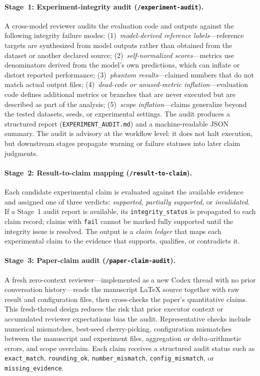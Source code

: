 \documentclass{article}
\theoremstyle{remark}
\begin{document}
\paragraph{Stage~1: Experiment-integrity audit (\texttt{/experiment-audit}).}
A cross-model reviewer audits the evaluation code and outputs against the following integrity failure modes:
(1)~\emph{model-derived reference labels}---reference targets are synthesized from model outputs rather than obtained from the dataset or another declared source;
(2)~\emph{self-normalized scores}---metrics use denominators derived from the model's own predictions, which can inflate or distort reported performance;
(3)~\emph{phantom results}---claimed numbers that do not match actual output files;
(4)~\emph{dead-code or unused-metric inflation}---evaluation code defines additional metrics or branches that are never executed but are described as part of the analysis;
(5)~\emph{scope inflation}---claims generalize beyond the tested datasets, seeds, or experimental settings.
The audit produces a structured report (\texttt{EXPERIMENT\_AUDIT.md}) and a machine-readable JSON summary.
The audit is advisory at the workflow level: it does not halt execution, but downstream stages propagate warning or failure statuses into later claim judgments.

\paragraph{Stage~2: Result-to-claim mapping (\texttt{/result-to-claim}).}
Each candidate experimental claim is evaluated against the available evidence and assigned one of three verdicts: \emph{supported}, \emph{partially supported}, or \emph{invalidated}.
If a Stage~1 audit report is available, its \texttt{integrity\_status} is propagated to each claim record; claims with \texttt{fail} cannot be marked fully supported until the integrity issue is resolved.
The output is a \emph{claim ledger} that maps each experimental claim to the evidence that supports, qualifies, or contradicts it.

\paragraph{Stage~3: Paper-claim audit (\texttt{/paper-claim-audit}).}
A fresh zero-context reviewer---implemented as a new Codex thread with no prior conversation history---reads the manuscript \LaTeX{} source together with raw result and configuration files, then cross-checks the paper's quantitative claims.
This fresh-thread design reduces the risk that prior executor context or accumulated reviewer expectations bias the audit.
Representative checks include numerical mismatches, best-seed cherry-picking, configuration mismatches between the manuscript and experiment files, aggregation or delta-arithmetic errors, and scope overclaim.
Each claim receives a structured audit status such as \texttt{exact\_match}, \texttt{rounding\_ok}, \texttt{number\_mismatch}, \texttt{config\_mismatch}, or \texttt{missing\_evidence}.
\end{document}
